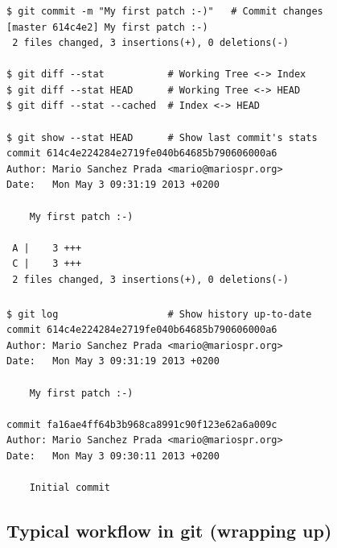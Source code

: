 \begin{frame}[fragile]
  \frametitle{\insertsubsection}

  \begin{small}
\begin{verbatim}
$ git commit -m "My first patch :-)"   # Commit changes
[master 614c4e2] My first patch :-)
 2 files changed, 3 insertions(+), 0 deletions(-)

$ git diff --stat           # Working Tree <-> Index
$ git diff --stat HEAD      # Working Tree <-> HEAD
$ git diff --stat --cached  # Index <-> HEAD

$ git show --stat HEAD      # Show last commit's stats
commit 614c4e224284e2719fe040b64685b790606000a6
Author: Mario Sanchez Prada <mario@mariospr.org>
Date:   Mon May 3 09:31:19 2013 +0200

    My first patch :-)

 A |    3 +++
 C |    3 +++
 2 files changed, 3 insertions(+), 0 deletions(-)
\end{verbatim}
  \end{small}
\end{frame}
\begin{frame}[fragile]
  \frametitle{\insertsubsection}

  \begin{small}
\begin{verbatim}
$ git log                   # Show history up-to-date
commit 614c4e224284e2719fe040b64685b790606000a6
Author: Mario Sanchez Prada <mario@mariospr.org>
Date:   Mon May 3 09:31:19 2013 +0200

    My first patch :-)

commit fa16ae4ff64b3b968ca8991c90f123e62a6a009c
Author: Mario Sanchez Prada <mario@mariospr.org>
Date:   Mon May 3 09:30:11 2013 +0200

    Initial commit
\end{verbatim}
  \end{small}

\end{frame}


\subsection{Typical workflow in git (wrapping up)}

